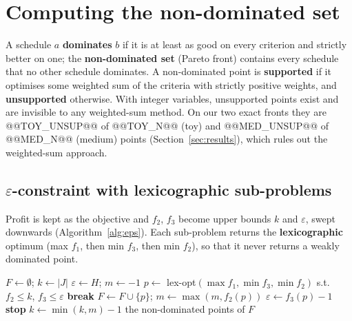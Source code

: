 \documentclass[11pt,a4paper]{article}
\theoremstyle{plain}
\newcommand{\eps}{\varepsilon}
\begin{document}
\section{Computing the non-dominated set}\label{sec:method}

A schedule $a$ \textbf{dominates} $b$ if it is at least as good on every criterion and strictly better on one; the \textbf{non-dominated set} (Pareto front) contains every schedule that no other schedule dominates. A non-dominated point is \textbf{supported} if it optimises some weighted sum of the criteria with strictly positive weights, and \textbf{unsupported} otherwise. With integer variables, unsupported points exist and are invisible to any weighted-sum method. On our two exact fronts they are @@TOY_UNSUP@@ of @@TOY_N@@ (toy) and @@MED_UNSUP@@ of @@MED_N@@ (medium) points (Section~\ref{sec:results}), which rules out the weighted-sum approach.

\subsection{\texorpdfstring{$\eps$}{Epsilon}-constraint with lexicographic sub-problems}

Profit is kept as the objective and $f_2$, $f_3$ become upper bounds $k$ and $\eps$, swept downwards (Algorithm~\ref{alg:eps}). Each sub-problem returns the \textbf{lexicographic} optimum (max $f_1$, then min $f_3$, then min $f_2$), so that it never returns a weakly dominated point.

\begin{algorithm}[htbp]
\caption{$\eps$-constraint with lexicographic sub-problems and level skipping}\label{alg:eps}
\begin{algorithmic}[1]
\State $F \gets \emptyset$; \quad $k \gets |J|$ 
  \State $\eps \gets H$; \quad $m \gets -1$ 
  \While{$\eps \ge 0$}
    \State $p \gets$ lex-opt$(\max f_1, \min f_3, \min f_2)$ s.t.\ $f_2\le k$, $f_3\le\eps$ 
      \State \textbf{break}
    \EndIf
    \State $F \gets F\cup\{p\}$; \quad $m \gets \max(m, f_2(p))$
    \State $\eps \gets f_3(p)-1$ 
  \EndWhile
    \State \textbf{stop}
  \EndIf
  \State $k \gets \min(k,m)-1$ 
\EndWhile
\State \Return the non-dominated points of $F$
\end{algorithmic}
\end{algorithm}
\end{document}
